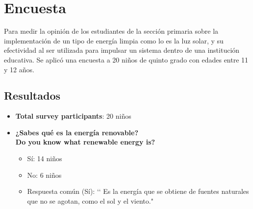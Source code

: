 \documentclass[12pt]{article}
\begin{document}
\section{Encuesta}
Para medir la opinión de los estudiantes de la sección primaria sobre la implementación de un tipo de energía limpia como lo es la luz solar, y su efectividad al ser utilizada para impulsar un sistema dentro de una institución educativa. Se aplicó una encuesta a 20 niños de quinto grado con edades entre 11 y 12 años.

\subsection{Resultados}
\begin{itemize}
      \item
            \textbf{Total survey participants}: 20 niños

      \item \textbf{¿Sabes qué es la energía renovable?}\\
            \textbf{Do you know what renewable energy is?}
            \begin{itemize}
                  \item Sí: 14 niños
                  \item No: 6 niños
                  \item Respuesta común (Sí): \lq\lq
                        Es la energía que se obtiene de fuentes naturales que no se agotan, como el sol y el viento."
            \end{itemize}
            \begin{minipage}{\linewidth}
                  \centering
                  \begin{minipage}{0.5\linewidth}
                  \end{minipage}%
            \end{minipage}


\end{itemize}
\end{document}
